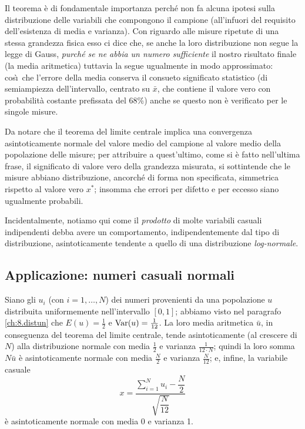 %
Il teorema \`e di fondamentale importanza perch\'e non fa
alcuna ipotesi sulla distribuzione delle variabili che
compongono il campione (all'infuori del requisito
dell'esistenza di media e varianza).  Con riguardo alle
misure ripetute di una stessa grandezza fisica esso ci dice
che, se anche la loro distribuzione non segue la legge di
Gauss, \emph{purch\'e se ne abbia un numero sufficiente} il
nostro risultato finale (la media aritmetica) tuttavia la
segue ugualmente in modo approssimato: cos\`\i\ che l'errore
della media conserva il consueto significato statistico (di
semiampiezza dell'intervallo, centrato su $\bar x$, che
contiene il valore vero con probabilit\`a costante
prefissata del 68\%) anche se questo non \`e verificato per
le singole misure.

Da notare che il teorema del limite centrale implica una
convergenza asintoticamente normale del valore medio del
campione al valore medio della popolazione delle misure; per
attribuire a quest'ultimo, come si \`e fatto nell'ultima
frase, il significato di valore vero della grandezza
misurata, si sottintende che le misure abbiano
distribuzione, ancorch\'e di forma non specificata,
simmetrica rispetto al valore vero $x^*$; insomma che errori
per difetto e per eccesso siano ugualmente probabili.%
%

Incidentalmente, notiamo qui come il \emph{prodotto} di
molte variabili casuali indipendenti debba avere un
comportamento, indipendentemente dal tipo di distribuzione,
asintoticamente tendente a quello di una distribuzione
\emph{log-normale}.

\subsection{Applicazione: numeri casuali normali}%
Siano gli $u_i$ (con $i=1,\ldots,N$) dei numeri provenienti
da una popolazione $u$ distribuita uniformemente
nell'intervallo $[0,1]$; abbiamo visto nel paragrafo
\ref{ch:8.distun} che $E(u) = \frac{1}{2}$ e $\operatorname{Var}(u) =
\frac{1}{12}$.  La loro media aritmetica $\bar u$, in
conseguenza del teorema del limite centrale, tende
asintoticamente (al crescere di $N$) alla distribuzione
normale con media $\frac{1}{2}$ e varianza $\frac{1}{12\cdot
  N}$; quindi la loro somma $N \bar u$ \`e asintoticamente
normale con media $\frac{N}{2}$ e varianza $\frac{N}{12}$;
e, infine, la variabile casuale
\begin{equation} \label{eq:9.nucaga}
  x = \frac{\sum\limits_{i=1}^N u_i -
    \dfrac{N}{2}}{\sqrt{\dfrac{N}{12}}}
\end{equation}
\`e asintoticamente normale con media 0 e varianza 1.

